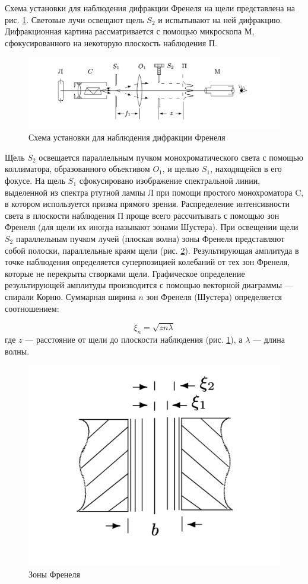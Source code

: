\documentclass[a4paper,12pt]{article} %
\begin{document}
Схема установки для наблюдения дифракции Френеля на щели представлена на рис. \ref{labA}. Световые лучи освещают щель $ S_2 $ и испытывают на ней дифракцию. Дифракционная картина рассматривается с помощью микроскопа М, сфокусированного на некоторую плоскость наблюдения П.

\begin{figure}[h!]
  \centering
  \includegraphics[width=0.8\linewidth]{a.png}
  \caption{Схема установки для наблюдения дифракции Френеля}
  \label{labA}
\end{figure}

Щель $ S_2 $ освещается параллельным пучком монохроматического света с помощью коллиматора, образованного объективом $ O_1 $, и щелью $S_1$, находящейся в его фокусе. На щель $ S_1 $ сфокусировано изображение спектральной линии, выделенной из спектра ртутной лампы Л при помощи простого монохроматора C, в котором используется призма прямого зрения. Распределение интенсивности света в плоскости наблюдения П проще всего рассчитывать с помощью зон Френеля (для щели их иногда называют зонами Шустера). При освещении щели $ S_2 $ параллельным пучком лучей (плоская волна) зоны Френеля представляют собой полоски, параллельные краям щели (рис. \ref{zone}). Результирующая амплитуда в точке наблюдения определяется суперпозицией колебаний от тех зон Френеля, которые не перекрыты створками щели. Графическое определение результирующей амплитуды производится с помощью векторной диаграммы --- спирали Корню. Суммарная ширина $ n $ зон Френеля (Шустера) определяется соотношением:

\begin{equation}\label{xin}
\xi_n = \sqrt{zn\lambda}
\end{equation}
где $ z $ --- расстояние от щели до плоскости наблюдения (рис. \ref{labA}), а $ \lambda $ --- длина волны.

\begin{figure}[h!]
  \centering
  \includegraphics[width=0.3\linewidth]{b.png}
  \caption{Зоны Френеля}
  \label{zone}
\end{figure}
\end{document}
